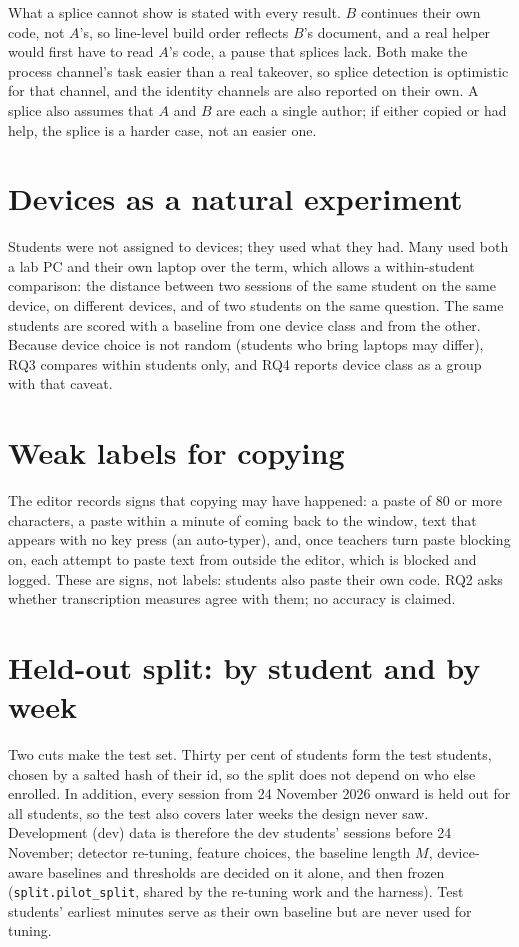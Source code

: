 What a splice cannot show is stated with every result. $B$ continues their own code,
not $A$'s, so line-level build order reflects $B$'s document, and a real helper would
first have to read $A$'s code, a pause that splices lack. Both make the process channel's
task easier than a real takeover, so splice detection is optimistic for that channel,
and the identity channels are also reported on their own. A splice also assumes that $A$
and $B$ are each a single author; if either copied or had help, the splice is a harder
case, not an easier one.

\section{Devices as a natural experiment}
\label{sec:devices}
Students were not assigned to devices; they used what they had. Many used both a lab PC
and their own laptop over the term, which allows a within-student comparison: the
distance between two sessions of the same student on the same device, on different
devices, and of two students on the same question. The same students are scored with a
baseline from one device class and from the other. Because device choice is not random
(students who bring laptops may differ), RQ3 compares within students only, and RQ4
reports device class as a group with that caveat.

\section{Weak labels for copying}
\label{sec:weak-labels}
The editor records signs that copying may have happened: a paste of 80 or more
characters, a paste within a minute of coming back to the window, text that appears
with no key press (an auto-typer), and, once teachers turn paste blocking on, each
attempt to paste text from outside the editor, which is blocked and logged. These are
signs, not labels: students also paste their own code. RQ2 asks whether transcription
measures agree with them; no accuracy is claimed.

\section{Held-out split: by student and by week}
\label{sec:split}
Two cuts make the test set. Thirty per cent of students form the test students, chosen
by a salted hash of their id, so the split does not depend on who else enrolled. In
addition, every session from 24 November 2026 onward is held out for all students, so
the test also covers later weeks the design never saw. Development (dev) data is
therefore the dev students' sessions before 24 November; detector re-tuning, feature
choices, the baseline length $M$, device-aware baselines and thresholds are decided on it
alone, and then frozen (\texttt{split.pilot\_split}, shared by the re-tuning work and
the harness). Test students' earliest minutes serve as their own baseline but are never
used for tuning.

